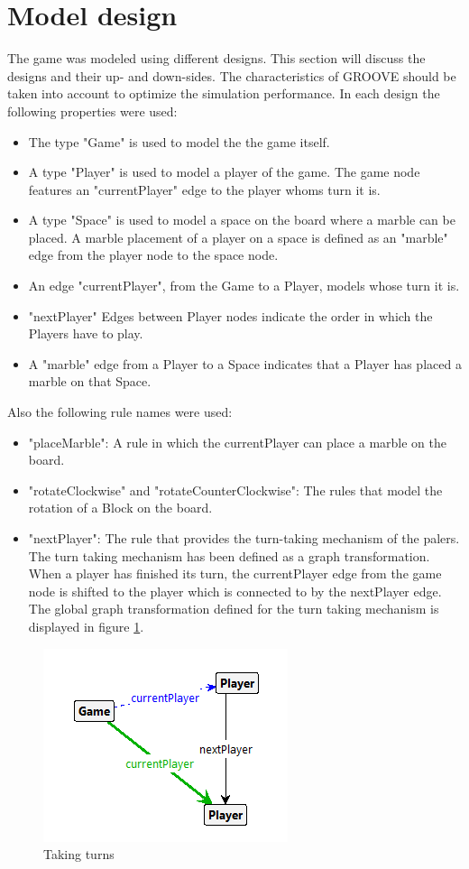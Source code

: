 \section{Model design}
\label{Design}
The game was modeled using different designs. This section will discuss the designs and their up- and down-sides.
The characteristics of GROOVE should be taken into account to optimize the simulation performance. 
In each design the following properties were used:

\begin{itemize}
\item The type "Game" is used to model the the game itself.
\item A type "Player" is used to model a player of the game. The game node features an "currentPlayer" edge to the player whoms turn it is.
\item A type "Space" is used to model a space on the board where a marble can be placed. A marble placement of a player on a space is defined as an "marble" edge from the player node to the space node.
\item An edge "currentPlayer", from the Game to a Player, models whose turn it is.
\item "nextPlayer" Edges between Player nodes indicate the order in which the Players have to play.
\item A "marble" edge from a Player to a Space indicates that a Player has placed a marble on that Space.
\end{itemize}

Also the following rule names were used:

\begin{itemize}
\item "placeMarble": A rule in which the currentPlayer can place a marble on the board.
\item "rotateClockwise" and "rotateCounterClockwise": The rules that model the rotation of a Block on the board.
\item "nextPlayer": The rule that provides the turn-taking mechanism of the palers. The turn taking mechanism has been defined as a graph transformation.
When a player has finished its turn, the currentPlayer edge from the game node is shifted to the player which is connected to by the nextPlayer edge.
The global graph transformation defined for the turn taking mechanism is displayed in figure \ref{fig:turn}.
\end{itemize}

\begin{figure}[!h]
    \centering
    \includegraphics[scale=0.5,clip]{Images/turn.png}
    \caption{Taking turns}
    \label{fig:turn}
\end{figure}

